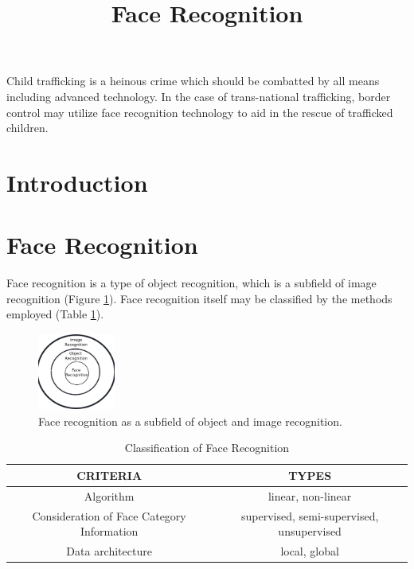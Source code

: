 \documentclass{SBCbookchapter}
\title{Face Recognition}
\author{}
\begin{document}
\maketitle



\vspace{.3in}
\begin{minipage}[r]{4.25in}{\small
  Child trafficking is a heinous crime which should be combatted by all means including advanced technology.  In the case of trans-national
  trafficking, border control may utilize face recognition technology to aid in the rescue of trafficked children.}
  \end{minipage}

\newpage

\section{Introduction}

\section{Face Recognition}
Face recognition is a type of object recognition, which is a subfield of image recognition (Figure \ref{fig1}). Face recognition itself may be classified by the methods employed (Table \ref{tab1}).

\begin{figure}[h]
\centering
\includegraphics[width=1in, height=1in]{fig1.eps}
 \caption{Face recognition as a subfield of object and image recognition.}
 \label{fig1}
\end{figure}


    \begin{table}[h]
\centering
\tiny
\begin{tabular}{|c|c||}\hline
CRITERIA & TYPES \\\hline
Algorithm & linear, non-linear\\
Consideration of Face Category Information& supervised, semi-supervised, unsupervised\\
Data architecture& local, global\\\hline
 \end{tabular}
  \caption{Classification of Face Recognition \cite{Gong}}
  \label{tab1}
\end{table}
\end{document}
